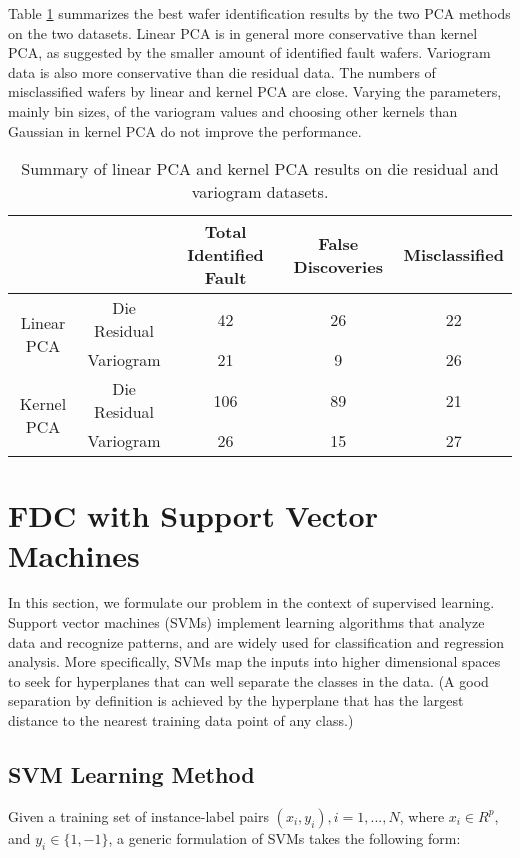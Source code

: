 \documentclass[english]{article}
\numberwithin{equation}{section}
\numberwithin{table}{section}
\numberwithin{figure}{section}
\begin{document}
Table \ref{tab:Summary-of-linear} summarizes the best wafer identification
results by the two PCA methods on the two datasets. Linear PCA is
in general more conservative than kernel PCA, as suggested by the
smaller amount of identified fault wafers. Variogram data is also
more conservative than die residual data. The numbers of misclassified
wafers by linear and kernel PCA are close. Varying the parameters,
mainly bin sizes, of the variogram values and choosing other kernels
than Gaussian in kernel PCA do not improve the performance.


\begin{table}[!tph]
\begin{centering}
\begin{tabular}{|c|c|c|c|c|}
\hline 
 &  & Total Identified Fault & False Discoveries & Misclassified\tabularnewline
\hline 
\multirow{2}{*}{Linear PCA} & Die Residual & 42 & 26 & 22\tabularnewline
\cline{2-5} 
 & Variogram & 21 & 9 & 26\tabularnewline
\hline 
\multirow{2}{*}{Kernel PCA} & Die Residual & 106 & 89 & 21\tabularnewline
\cline{2-5} 
 & Variogram & 26 & 15 & 27\tabularnewline
\hline 
\end{tabular}
\par\end{centering}

\caption{Summary of linear PCA and kernel PCA results on die residual and variogram
datasets. \label{tab:Summary-of-linear}}

\end{table}






\section{FDC with Support Vector Machines} \label{svm}
\hspace{12 pt}
In this section, we formulate our problem in the context of supervised
learning. Support vector machines (SVMs) implement learning algorithms
that analyze data and recognize patterns, and are widely used for
classification and regression analysis. More specifically, SVMs map
the inputs into higher dimensional spaces to seek for hyperplanes
that can well separate the classes in the data. (A good separation
by definition is achieved by the hyperplane that has the largest distance
to the nearest training data point of any class.\cite{libsvm})


\subsection{SVM Learning Method}
\hspace{12 pt}
Given a training set of instance-label pairs $(x_{i},y_{i}),i=1,...,N$,
where $x_{i}\in R^{p}$, and $y_{i}\in\{1,-1\}$, a generic formulation
of SVMs takes the following form:
\end{document}
